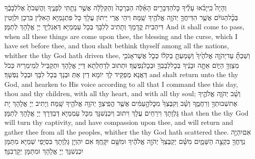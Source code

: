 \newperek
{}
{וְהָיָה֩ כִֽי\maqqaf יָבֹ֨אוּ עָלֶ֜יךָ כׇּל\maqqaf הַדְּבָרִ֣ים הָאֵ֗לֶּה הַבְּרָכָה֙ וְהַקְּלָלָ֔ה אֲשֶׁ֥ר נָתַ֖תִּי לְפָנֶ֑יךָ וַהֲשֵׁבֹתָ֙ אֶל\maqqaf לְבָבֶ֔ךָ בְּכׇ֨ל\maqqaf הַגּוֹיִ֔ם אֲשֶׁ֧ר הִדִּיחֲךָ֛ יְהֹוָ֥ה אֱלֹהֶ֖יךָ שָֽׁמָּה׃}
{וִיהֵי אֲרֵי יֵיתוֹן עֲלָךְ כָּל פִּתְגָמַיָּא הָאִלֵּין בִּרְכָן וּלְוָטִין דִּיהַבִית קֳדָמָךְ וְתָתִיב לְלִבָּךְ בְּכָל עַמְמַיָּא דְּאַגְלְיָךְ יְיָ אֱלָהָךְ לְתַמָּן׃}
{And it shall come to pass, when all these things are come upon thee, the blessing and the curse, which I have set before thee, and thou shalt bethink thyself among all the nations, whither the \lord\space thy God hath driven thee,}{}
{וְשַׁבְתָּ֞ עַד\maqqaf יְהֹוָ֤ה אֱלֹהֶ֙יךָ֙ וְשָׁמַעְתָּ֣ בְקֹל֔וֹ כְּכֹ֛ל אֲשֶׁר\maqqaf אָנֹכִ֥י מְצַוְּךָ֖ הַיּ֑וֹם אַתָּ֣ה וּבָנֶ֔יךָ בְּכׇל\maqqaf לְבָבְךָ֖ וּבְכׇל\maqqaf נַפְשֶֽׁךָ׃}
{וּתְתוּב לְדַחְלְתָא דַּייָ אֱלָהָךְ וּתְקַבֵּיל לְמֵימְרֵיהּ כְּכֹל דַּאֲנָא מְפַקֵּיד לָךְ יוֹמָא דֵין אַתְּ וּבְנָךְ בְּכָל לִבָּךְ וּבְכָל נַפְשָׁךְ׃}
{and shalt return unto the \lord\space thy God, and hearken to His voice according to all that I command thee this day, thou and thy children, with all thy heart, and with all thy soul;}{}
{וְשָׁ֨ב יְהֹוָ֧ה אֱלֹהֶ֛יךָ אֶת\maqqaf שְׁבוּתְךָ֖ וְרִחֲמֶ֑ךָ וְשָׁ֗ב וְקִבֶּצְךָ֙ מִכׇּל\maqqaf הָ֣עַמִּ֔ים אֲשֶׁ֧ר הֱפִֽיצְךָ֛ יְהֹוָ֥ה אֱלֹהֶ֖יךָ שָֽׁמָּה׃}
{וְיָתִיב יְיָ אֱלָהָךְ יָת גָּלְוָתָךְ וִירַחֵים עֲלָךְ וִיתוּב וְיִכְנְשִׁנָּךְ מִכָּל עַמְמַיָּא דְּבַדְּרָךְ יְיָ אֱלָהָךְ לְתַמָּן׃}
{that then the \lord\space thy God will turn thy captivity, and have compassion upon thee, and will return and gather thee from all the peoples, whither the \lord\space thy God hath scattered thee.}{}
{אִם\maqqaf יִהְיֶ֥ה נִֽדַּחֲךָ֖ בִּקְצֵ֣ה הַשָּׁמָ֑יִם מִשָּׁ֗ם יְקַבֶּצְךָ֙ יְהֹוָ֣ה אֱלֹהֶ֔יךָ וּמִשָּׁ֖ם יִקָּחֶֽךָ׃}
{אִם יִהְוְיָן גָּלְוָתָךְ בִּסְיָפֵי שְׁמַיָּא מִתַּמָּן יִכְנְשִׁנָּךְ יְיָ אֱלָהָךְ וּמִתַּמָּן יְקָרְבִנָּךְ׃}
